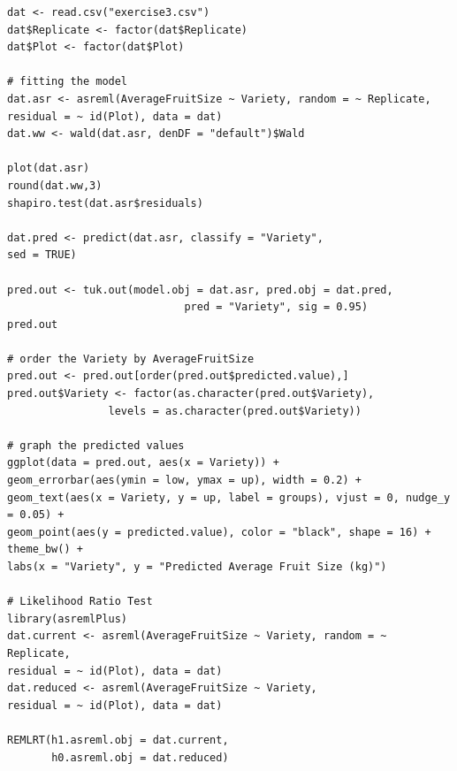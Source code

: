 \documentclass[a4paper, 10pt, fleqn, twosided]{memoir}
\begin{document}

\begin{tcolorbox}[title = Exercise 9 code]
\begin{verbatim}
dat <- read.csv("exercise3.csv")
dat$Replicate <- factor(dat$Replicate)
dat$Plot <- factor(dat$Plot)

# fitting the model
dat.asr <- asreml(AverageFruitSize ~ Variety, random = ~ Replicate,
residual = ~ id(Plot), data = dat)
dat.ww <- wald(dat.asr, denDF = "default")$Wald

plot(dat.asr)
round(dat.ww,3)
shapiro.test(dat.asr$residuals)

dat.pred <- predict(dat.asr, classify = "Variety",
sed = TRUE)

pred.out <- tuk.out(model.obj = dat.asr, pred.obj = dat.pred,
                            pred = "Variety", sig = 0.95)
pred.out

# order the Variety by AverageFruitSize
pred.out <- pred.out[order(pred.out$predicted.value),]
pred.out$Variety <- factor(as.character(pred.out$Variety),
                levels = as.character(pred.out$Variety))
 
# graph the predicted values 
ggplot(data = pred.out, aes(x = Variety)) +
geom_errorbar(aes(ymin = low, ymax = up), width = 0.2) +
geom_text(aes(x = Variety, y = up, label = groups), vjust = 0, nudge_y = 0.05) +
geom_point(aes(y = predicted.value), color = "black", shape = 16) + theme_bw() +
labs(x = "Variety", y = "Predicted Average Fruit Size (kg)")

# Likelihood Ratio Test
library(asremlPlus)
dat.current <- asreml(AverageFruitSize ~ Variety, random = ~ Replicate,
residual = ~ id(Plot), data = dat)
dat.reduced <- asreml(AverageFruitSize ~ Variety,
residual = ~ id(Plot), data = dat)

REMLRT(h1.asreml.obj = dat.current,
       h0.asreml.obj = dat.reduced)
\end{verbatim}
\end{tcolorbox}

\end{document}

